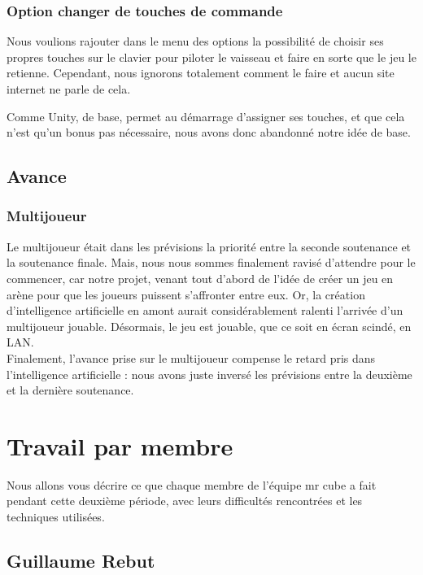 \documentclass[10pt, titlepage]{report}
\begin{document}
\subsection{Option changer de touches de commande}

Nous voulions rajouter dans le menu des options la possibilité de choisir ses propres touches sur le clavier pour piloter le vaisseau et faire en sorte que le jeu le retienne. Cependant, nous ignorons totalement comment le faire et aucun site internet ne parle de cela.

Comme Unity, de base, permet au démarrage d'assigner ses touches, et que cela n'est qu'un bonus pas nécessaire, nous avons donc abandonné notre idée de base.\\

\section{Avance}

\subsection{Multijoueur}
Le multijoueur était dans les prévisions la priorité entre la seconde soutenance et la soutenance finale. Mais, nous nous sommes finalement ravisé d'attendre pour le commencer, car notre projet, venant tout d'abord de l'idée de créer un jeu en arène pour que les joueurs puissent s'affronter entre eux. Or, la création d'intelligence artificielle en amont aurait considérablement ralenti l'arrivée d'un multijoueur jouable. Désormais, le jeu est jouable, que ce soit en écran scindé, en LAN.\\

Finalement, l'avance prise sur le multijoueur compense le retard pris dans l'intelligence artificielle : nous avons juste inversé les prévisions entre la deuxième et la dernière soutenance.

\chapter{Travail par membre}
Nous allons vous décrire ce que chaque membre de l'équipe mr cube a fait pendant cette deuxième période, avec leurs difficultés rencontrées et les techniques utilisées.

\section{Guillaume Rebut}
\end{document}
